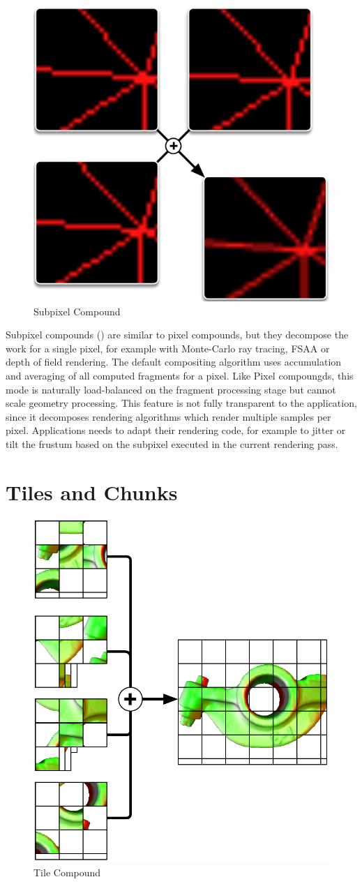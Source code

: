 \begin{figure}
 \includegraphics[width=.382\textwidth]{images/Subpixel}
 {\caption{\label{fSubpixel}Subpixel Compound}}
\end{figure}

Subpixel compounds () are similar to pixel compounds, but they
decompose the work for a single pixel, for example with Monte-Carlo ray tracing,
FSAA or depth of field rendering. The default compositing algorithm uses
accumulation and averaging of all computed fragments for a pixel. Like Pixel
compoungds, this mode is naturally load-balanced on the fragment processing
stage but cannot scale geometry processing. This feature is not fully
transparent to the application, since it decomposes rendering algorithms which
render multiple samples per pixel. Applications needs to adapt their rendering
code, for example to jitter or tilt the frustum based on the subpixel executed
in the current rendering pass.

\section{Tiles and Chunks\label{sTile}}

\begin{figure}
 \includegraphics[width=.382\textwidth]{images/tile}
 {\caption{\label{fTiles}Tile Compound}}
\end{figure}

